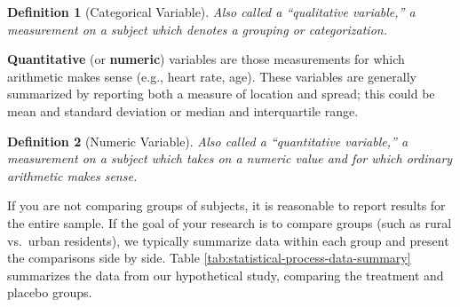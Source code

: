 \documentclass[
]{book}
\theoremstyle{plain}
\theoremstyle{mydefn}
\newtheorem{definition}{Definition}[chapter]
\theoremstyle{myexmpl}
\theoremstyle{remark}
\begin{document}
\begin{definition}[Categorical Variable]
Also called a ``qualitative variable,'' a measurement on a subject which denotes a grouping or categorization.
\end{definition}

\textbf{Quantitative} (or \textbf{numeric}) variables are those measurements for which arithmetic makes sense (e.g., heart rate, age). These variables are generally summarized by reporting both a measure of location and spread; this could be mean and standard deviation or median and interquartile range.

\begin{definition}[Numeric Variable]
Also called a ``quantitative variable,'' a measurement on a subject which takes on a numeric value \emph{and} for which ordinary arithmetic makes sense.
\end{definition}

If you are not comparing groups of subjects, it is reasonable to report results for the entire sample. If the goal of your research is to compare groups (such as rural vs.~urban residents), we typically summarize data within each group and present the comparisons side by side. Table \ref{tab:statistical-process-data-summary} summarizes the data from our hypothetical study, comparing the treatment and placebo groups.

\begin{table}

\caption{\label{tab:statistical-process-data-summary}Summary of subjects from our hypothetical study. Qualitative variables are summarized as N (pct) and quantitative variables are summarized as mean (standard deviation).}
\centering
{}
\end{table}
\end{document}
